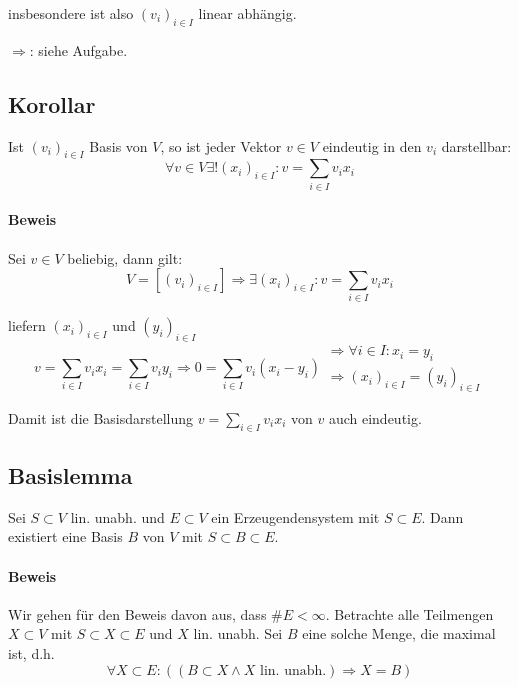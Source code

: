 	insbesondere ist also $(v_i)_{i\in I}$ linear abhängig.

	$\Rightarrow$: siehe Aufgabe.
	
\subsection{Korollar}
	\begin{Korollar}
		Ist $(v_i)_{i\in I}$ Basis von $ V $, so ist jeder Vektor $v\in V$ eindeutig in den $v_i$ darstellbar:
	\begin{equation*}
		\forall v\in V \exists! (x_i)_{i\in I}: v = \sum_{i\in I} v_ix_i
	\end{equation*}
	\end{Korollar}

\paragraph{Beweis}
	Sei $v\in V$ beliebig, dann gilt:
	\begin{equation*}
		V = [(v_i)_{i\in I}] \Rightarrow \exists (x_i)_{i\in I}: v = \sum_{i\in I} v_ix_i
	\end{equation*}

	liefern $(x_i)_{i\in I}$ und $(y_i)_{i\in I}$
	\begin{equation*}
		v = \sum_{i\in I} v_ix_i = \sum_{i\in I}v_iy_i \Rightarrow 0 = \sum_{i\in I} v_i(x_i-y_i)
		\begin{array}{l}
			\Rightarrow \forall i\in I: x_i = y_i\\
			\Rightarrow (x_i)_{i\in I} = (y_i)_{i\in I}
		\end{array}
	\end{equation*}

	Damit ist die Basisdarstellung $v = \sum_{i\in I} v_ix_i$ von $ v $ auch eindeutig.


\subsection{Basislemma}
    \begin{Lemma}[Basislemma]
    	Sei $S\subset V$ lin. unabh. und $E\subset V$ ein Erzeugendensystem mit $S\subset E$. Dann existiert eine Basis $B$ von $V$ mit $S\subset B\subset E$.
    \end{Lemma}

\paragraph{Beweis}
    Wir gehen für den Beweis davon aus, dass $\#E<\infty$. Betrachte alle Teilmengen $X\subset V$ mit $S\subset X\subset E$ und $X$ lin. unabh. Sei $B$ eine solche Menge, die maximal ist, d.h.
    \begin{equation*}
        \forall X\subset E: ((B\subset X\land X\text{ lin. unabh.}) \Rightarrow X= B)
    \end{equation*}
    
